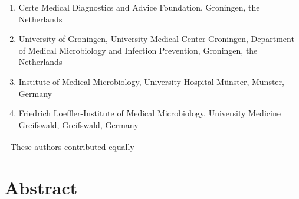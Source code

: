 \documentclass[
]{book}
\providecommand{\tightlist}{%
  \setlength{\itemsep}{0pt}\setlength{\parskip}{0pt}}
\begin{document}
\begin{enumerate}
\def\labelenumi{\arabic{enumi}.}
\tightlist
\item
  Certe Medical Diagnostics and Advice Foundation, Groningen, the Netherlands
\item
  University of Groningen, University Medical Center Groningen, Department of Medical Microbiology and Infection Prevention, Groningen, the Netherlands
\item
  Institute of Medical Microbiology, University Hospital Münster, Münster, Germany
\item
  Friedrich Loeffler-Institute of Medical Microbiology, University Medicine Greifswald, Greifswald, Germany
\end{enumerate}

\textsuperscript{‡} These authors contributed equally

\hypertarget{abstract-5}{%
\section*{Abstract}\label{abstract-5}}
\end{document}
